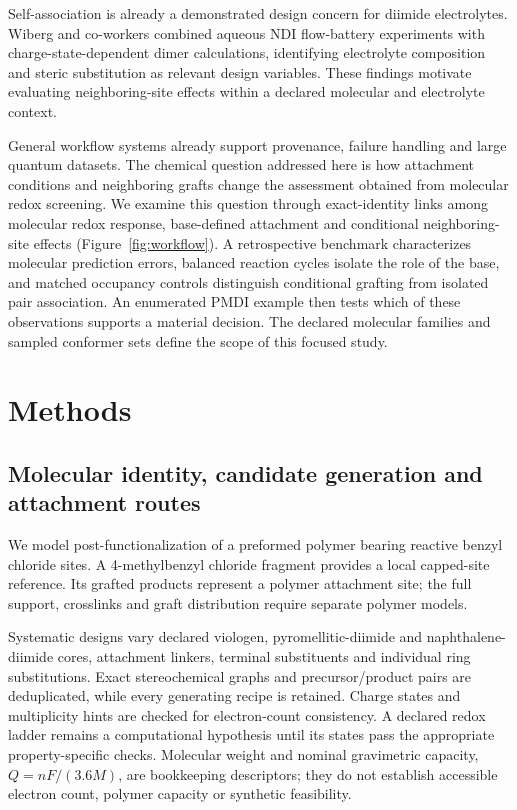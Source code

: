 \documentclass[11pt]{article}
\begin{document}
Self-association is already a demonstrated design concern for diimide electrolytes. Wiberg and co-workers combined aqueous NDI flow-battery experiments with charge-state-dependent dimer calculations, identifying electrolyte composition and steric substitution as relevant design variables.\cite{wiberg2021} These findings motivate evaluating neighboring-site effects within a declared molecular and electrolyte context.

General workflow systems already support provenance, failure handling and large quantum datasets.\cite{aiida2020,fireworks2015} The chemical question addressed here is how attachment conditions and neighboring grafts change the assessment obtained from molecular redox screening. We examine this question through exact-identity links among molecular redox response, base-defined attachment and conditional neighboring-site effects (Figure~\ref{fig:workflow}). A retrospective benchmark characterizes molecular prediction errors, balanced reaction cycles isolate the role of the base, and matched occupancy controls distinguish conditional grafting from isolated pair association. An enumerated PMDI example then tests which of these observations supports a material decision. The declared molecular families and sampled conformer sets define the scope of this focused study.

\section{Methods}
\subsection{Molecular identity, candidate generation and attachment routes}
We model post-functionalization of a preformed polymer bearing reactive benzyl chloride sites. A 4-methylbenzyl chloride fragment provides a local capped-site reference. Its grafted products represent a polymer attachment site; the full support, crosslinks and graft distribution require separate polymer models.

Systematic designs vary declared viologen, pyromellitic-diimide and naphthalene-diimide cores, attachment linkers, terminal substituents and individual ring substitutions. Exact stereochemical graphs and precursor/product pairs are deduplicated, while every generating recipe is retained. Charge states and multiplicity hints are checked for electron-count consistency. A declared redox ladder remains a computational hypothesis until its states pass the appropriate property-specific checks. Molecular weight and nominal gravimetric capacity, $Q=nF/(3.6M)$, are bookkeeping descriptors; they do not establish accessible electron count, polymer capacity or synthetic feasibility.
\end{document}
